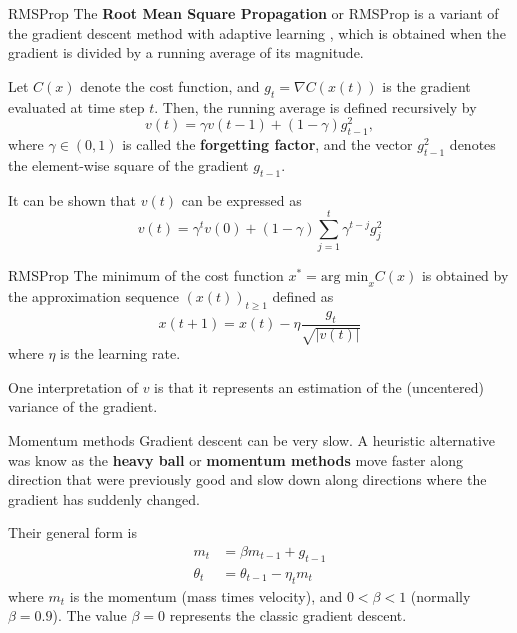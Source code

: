 \documentclass{beamer}
\begin{document}
\begin{frame}{RMSProp}
	 The \textbf{Root Mean Square Propagation} or RMSProp is a variant of the gradient descent method with adaptive learning , which is obtained when the gradient is divided by a running average of its magnitude.
	 
	 Let $C(x)$ denote the cost function, and $g_t= \nabla C(x(t))$ is the gradient evaluated at time step $t$. Then, the running average is defined recursively by
	 \begin{equation*}
	 	v(t)=\gamma v(t-1)+(1-\gamma)g_{t-1}^2,
	 \end{equation*}
	 where $\gamma\in (0,1)$ is called the \textbf{forgetting factor}, and the vector $g_{t-1}^2$ denotes the element-wise square of the gradient $g_{t-1}$. 
	 
	 It can be shown that  $v(t)$ can be expressed as
	 \begin{equation*}
	 	v(t)= \gamma^t v(0)+ (1-\gamma) \sum_{j=1}^t \gamma^{t-j}g_j^2
	 \end{equation*}
	 
\end{frame}
\begin{frame}{RMSProp}
	The minimum of the cost function $x^* = \text{arg min}_x C(x)$ is obtained by the approximation sequence $(x(t))_{t\ge 1}$ defined as
	\begin{equation*}
		x(t+1)= x(t)- \eta \frac{g_t}{\sqrt{|v(t)|}}
	\end{equation*}
where $\eta$ is the learning rate. 

One interpretation of $v$ is that it represents an estimation of the (uncentered) variance of the gradient. 
\end{frame}

\begin{frame}{Momentum methods}
	Gradient descent can be very slow. A heuristic alternative was know as the \textbf{heavy ball} or \textbf{momentum methods} move faster along direction that were previously good and slow down along directions where the gradient has suddenly changed. 
	
	Their general form is
	\begin{align*}
		m_t&= \beta m_{t-1}+ g_{t-1}\\
		\theta_t &= \theta_{t-1}-\eta_t m_t
	\end{align*}
	where $m_t$ is the momentum (mass times velocity), and $0<\beta <1$ (normally $\beta=0.9$). The value $\beta=0$ represents the classic gradient descent.
\end{frame}
\end{document}
